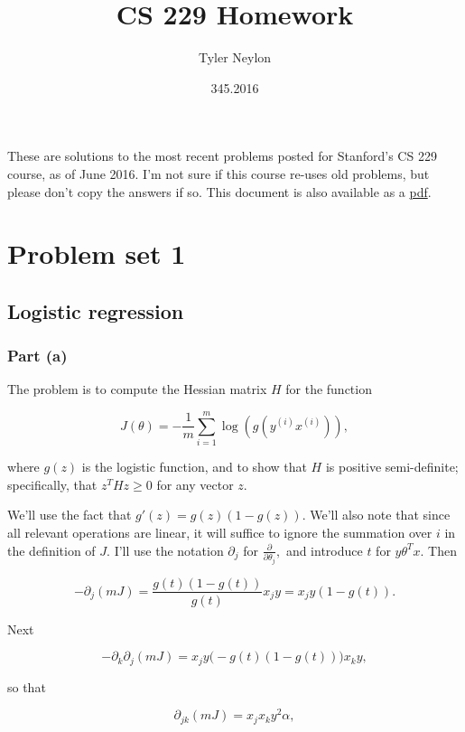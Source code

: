 \documentclass[]{article}
\title{CS 229 Homework}
\author{Tyler Neylon}
\date{345.2016}
\begin{document}
\maketitle

\newcommand{\R}{\mathbb{R}}
\newcommand{\eqnset}[1]{\left.\mbox{$#1$}\quad\quad\right\rbrace}
\newcommand{\tr}{\text{tr}\;}
\renewcommand{\th}{\theta}
\newcommand{\toi}{^{(i)}}

These are solutions to the most recent problems posted for Stanford's CS
229 course, as of June 2016. I'm not sure if this course re-uses old
problems, but please don't copy the answers if so. This document is also
available as a
\href{http://tylerneylon.com/notes/cs229/cs229hw.pdf}{pdf}.

\section{Problem set 1}\label{problem-set-1}

\subsection{Logistic regression}\label{logistic-regression}

\subsubsection{Part (a)}\label{part-a}

The problem is to compute the Hessian matrix \(H\) for the function

\[J(\th) = -\frac{1}{m}\sum_{i=1}^m\log(g(y\toi x\toi)),\]

where \(g(z)\) is the logistic function, and to show that \(H\) is
positive semi-definite; specifically, that \(z^THz\ge 0\) for any vector
\(z.\)

We'll use the fact that \(g'(z) = g(z)(1-g(z)).\) We'll also note that
since all relevant operations are linear, it will suffice to ignore the
summation over \(i\) in the definition of \(J.\) I'll use the notation
\(\partial_j\) for \(\frac{\partial}{\partial\th_j},\) and introduce
\(t\) for \(y\th^Tx.\) Then

\[-\partial_j(mJ) = \frac{g(t)(1-g(t))}{g(t)}x_jy = x_jy(1-g(t)).\]

Next

\[-\partial_k\partial_j(mJ) = x_jy\big(-g(t)(1-g(t))\big)x_ky,\]

so that

\[\partial_{jk}(mJ) = x_jx_ky^2\alpha,\]
\end{document}
